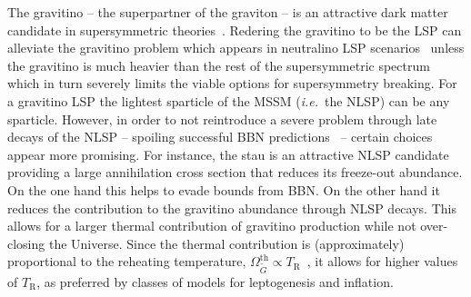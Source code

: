 \documentclass[preprint,number,sort&compress,twocolumn,3p]{elsstyarticle}
\newcommand{\s}[1]{\widetilde{#1}}
\newcommand{\com}[1]{\emph{\color{red}[#1]}}  %
\begin{document}
The gravitino -- the superpartner of the graviton -- is an attractive dark matter 
candidate in supersymmetric theories~\cite{Fayet:1981sq,Pagels:1981ke}. Redering the gravitino to be the LSP
can alleviate the gravitino problem
which appears in neutralino LSP scenarios~\cite{Weinberg:1982zq,Ellis:1984eq,Falomkin:1984eu,Ellis:1984er}
unless the gravitino is much heavier than the rest of the supersymmetric spectrum 
which in turn severely limits the viable options for supersymmetry breaking.
For a gravitino LSP the lightest sparticle of the MSSM (\emph{i.e.}~the NLSP) can
be any sparticle. However, in order to not reintroduce a severe problem through
late decays of the NLSP -- spoiling successful BBN predictions~\cite{Moroi:1993mb} -- certain choices
appear more promising. For instance, the stau is an attractive NLSP candidate 
providing a large annihilation cross section that reduces its freeze-out abundance.
On the one hand this helps to evade bounds from BBN\@.
On the other hand it reduces the contribution to the gravitino abundance through
NLSP decays. This allows for a larger thermal contribution of gravitino 
production while not over-closing the Universe. Since the thermal contribution is 
(approximately) proportional
to the reheating temperature, $\Omega^{\text{th}}_{\s G}\propto T_\text{R}$~\cite{Bolz:1998ek,Bolz:2000fu,Pradler:2006hh},
it allows for higher values of $T_\text{R}$, as preferred by classes of models for leptogenesis and
inflation.


\end{document}
